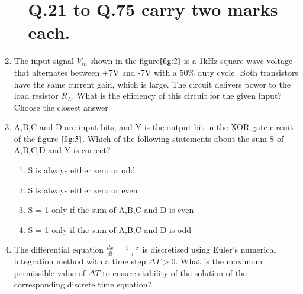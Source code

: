 \documentclass[journal]{IEEEtran}
\numberwithin{equation}{enumi}
\numberwithin{figure}{enumi}
\begin{document}
\begin{enumerate}
\begin{enumerate}
\section*{Q.21 to Q.75 carry two marks each.}
\end{enumerate}
\bigskip
\item The input signal $V_{in}$ shown in the figure$\ref{fig:2}$ is a 1kHz square wave voltage that alternates between +7V and -7V with a 50\% duty cycle. Both transistors have the same current gain, which is large. The circuit delivers power to the load resistor $R_L$. What is the efficiency of this circuit for the given input? Choose the closest answer

\begin{figure}[!ht]
    
			\centering
			
			\caption{}
			\label{fig:2}
		\end{figure}

\begin{enumerate}
\end{enumerate}
\bigskip
\item A,B,C and D are input bits, and Y is the output bit in the XOR gate circuit of the figure $\ref{fig:3}$. Which of the following statements about the sum S of A,B,C,D and Y is correct?
\begin{figure}[!ht]
    
			\centering
			
			\caption{}
			\label{fig:3}
		\end{figure}

\begin{enumerate}

        \item S is always either zero or odd
        \item S is always either zero or even
        \item S = 1 only if the sum of A,B,C and D is even 
        \item S = 1 only if the sum of A,B,C and D is odd
\end{enumerate}
\bigskip
\item The differential equation $\frac{dx}{dt}=\frac{1-x}{\tau}$ is discretised using Euler's numerical integration method with a time step $\Delta T > 0$. What is the maximum permissible value of $\Delta T$ to ensure stability of the solution of the corresponding discrete time equation?


\end{enumerate}
\end{document}
